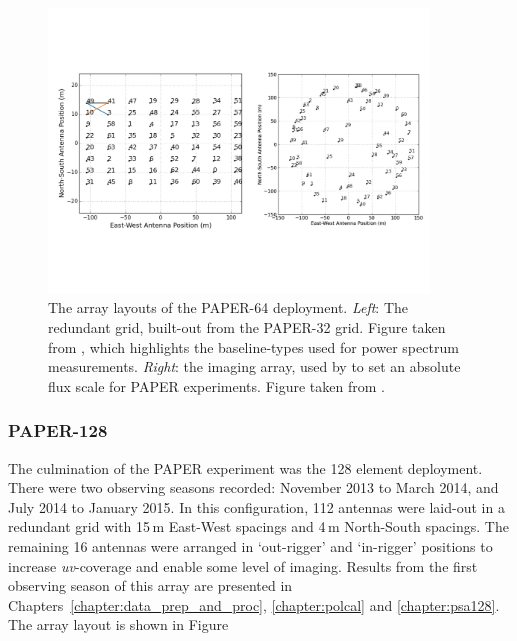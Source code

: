 \begin{figure}
\centering
\includegraphics[width=0.9\textwidth]{chapters/instruments/figures/psa64_layouts.pdf}
\caption[The array layouts of the PAPER-64 deployment.]{The array layouts of the PAPER-64 deployment. \textit{Left}: The redundant grid, built-out from the PAPER-32 grid. Figure taken from \cite{Ali.15}, which highlights the baseline-types used for power spectrum measurements. \textit{Right}: the imaging array, used by \cite{Jacobs.13} to set an absolute flux scale for PAPER experiments. Figure taken from \cite{Jacobs.13}.}
\label{fig:instruments_psa64layout}
\end{figure}

\subsubsection{PAPER-128}

The culmination of the PAPER experiment was the 128 element deployment. There were two observing seasons recorded: November 2013 to March 2014, and July 2014 to January 2015. In this configuration, 112 antennas were laid-out in a redundant grid with 15\,m East-West spacings and 4\,m North-South spacings. The remaining 16 antennas were arranged in `out-rigger' and `in-rigger' positions to increase \textit{uv}-coverage and enable some level of imaging. Results from the first observing season of this array are presented in Chapters~\ref{chapter:data_prep_and_proc}, \ref{chapter:polcal} and \ref{chapter:psa128}. The array layout is shown in Figure

